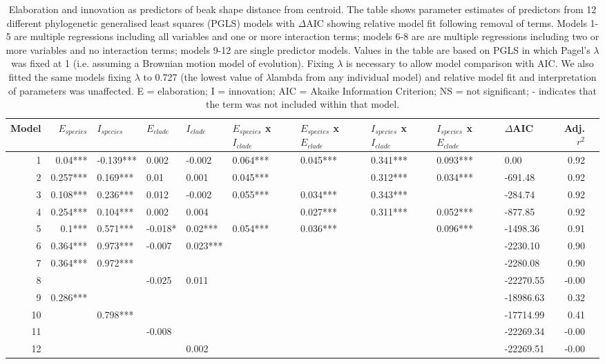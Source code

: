 \documentclass[12pt,letterpaper]{article}
\begin{document}
\begin{landscape}
\begin{table}[ht]
\centering
\begin{tabular}{rrllllllllrr}
  \hline
 Model & $E_{species}$ & $I_{species}$ & $E_{clade}$ & $I_{clade}$ & $E_{species}$ x $I_{clade}$ & $E_{species}$ x $E_{clade}$ & $I_{species}$ x $I_{clade}$ & $I_{species}$ x $E_{clade}$ & $\Delta$AIC & Adj. $r^2$ \\ 
  \hline
1 & 0.04*** & -0.139*** & 0.002 & -0.002 & 0.064*** & 0.045*** & 0.341*** & 0.093*** & 0.00 & 0.92 \\ 
2 & 0.257*** & 0.169*** & 0.01 & 0.001 & 0.045*** &  & 0.312*** & 0.034*** & -691.48 & 0.92 \\ 
3 & 0.108*** & 0.236*** & 0.012 & -0.002 & 0.055*** & 0.034*** & 0.343*** &  & -284.74 & 0.92 \\ 
4 & 0.254*** & 0.104*** & 0.002 & 0.004 &  & 0.027*** & 0.311*** & 0.052*** & -877.85 & 0.92 \\ 
5 & 0.1*** & 0.571*** & -0.018* & 0.02*** & 0.054*** & 0.036*** &  & 0.096*** & -1498.36 & 0.91 \\ 
6 & 0.364*** & 0.973*** & -0.007 & 0.023*** &  &  &  &  & -2230.10 & 0.90 \\ 
7 & 0.364*** & 0.972*** &  &  &  &  &  &  & -2280.08 & 0.90 \\ 
8 &  &  & -0.025 & 0.011 &  &  &  &  & -22270.55 & -0.00 \\ 
9 & 0.286*** &  &  &  &  &  &  &  & -18986.63 & 0.32 \\ 
10 &  & 0.798*** &  &  &  &  &  &  & -17714.99 & 0.41 \\ 
11 &  &  & -0.008 &  &  &  &  &  & -22269.34 & -0.00 \\ 
12 &  &  &  & 0.002 &  &  &  &  & -22269.51 & -0.00 \\ 
   \hline
\end{tabular}
\caption{Elaboration and innovation as predictors of beak shape distance from centroid.
The table shows parameter estimates of predictors from  12 different phylogenetic generalised least squares (PGLS) models with $\Delta$AIC showing relative model fit following removal of terms. Models 1-5 are multiple regressions including all variables and one or more interaction terms; models 6-8 are are multiple regressions including two or more variables and no interaction terms; models 9-12 are single predictor models. Values in the table are based on PGLS in which Pagel’s $\lambda$ was fixed at 1 (i.e. assuming a Brownian motion model of evolution). Fixing $\lambda$ is necessary to allow model comparison with AIC. We also fitted the same models fixing $\lambda$ to 0.727 (the lowest value of $\lambda$lambda from any individual model) and relative model fit and interpretation of parameters was unaffected. E = elaboration; I = innovation; AIC = Akaike Information Criterion; NS = not significant; - indicates that the term was not included within that model.}
\label{Tab:pgls}
\end{table}
\end{landscape}
\end{document}
